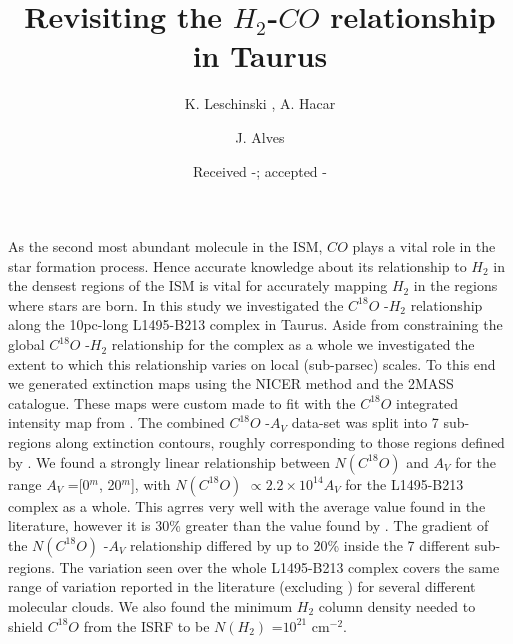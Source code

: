 \documentclass{aa}
\begin{document}
 

   \title{Revisiting the $H_2$-$CO$ relationship in Taurus}
   \subtitle{}
   \author{K. Leschinski , A. Hacar \and J. Alves}
          


   \date{Received -; accepted -}

\newcommand{\eco}{$C^{18}O$ }
\newcommand{\neco}{$N(C^{18}O)$ }
\newcommand{\ieco}{$I(C^{18}O)$ }
\newcommand{\av}{$A_V$ }
\newcommand{\htwo}{$H_2$ }
\newcommand{\nhtwo}{$N(H_2)$ }

  \abstract
   {As the second most abundant molecule in the ISM, $CO$ plays a vital role in the star formation process. Hence accurate knowledge about its relationship to \htwo in the densest regions of the ISM is vital for accurately mapping \htwo in the regions where stars are born.}
   {In this study we investigated the \eco -\htwo relationship along the 10pc-long L1495-B213 complex in Taurus. Aside from constraining the global \eco-\htwo relationship for the complex as a whole we investigated the extent to which this relationship varies on local (sub-parsec) scales.}
   {To this end we generated extinction maps using the NICER method and the 2MASS catalogue. These maps were custom made to fit with the \eco integrated intensity map from \citet{hacar13}. The combined \eco-\av data-set was split into 7 sub-regions along extinction contours, roughly corresponding to those regions defined by \citet{barnard27}.}
   {We found a strongly linear relationship between \neco and \av for the range \av=[0$^m$, 20$^m$], with \neco $\propto 2.2\times 10^{14} A_V$ for the L1495-B213 complex as a whole. This agrres very well with the average value found in the literature, however it is 30\% greater than the value found by \citet{frerking82}. The gradient of the \neco-\av relationship differed by up to 20\% inside the 7 different sub-regions. The variation seen over the whole L1495-B213 complex covers the same range of variation reported in the literature (excluding \citealt{frerking82}) for several different molecular clouds.  We also found the minimum \htwo column density needed to shield \eco from the ISRF to be \nhtwo=$10^{21}$ cm$^{-2}$.}
   {}
   \maketitle
\end{document}
